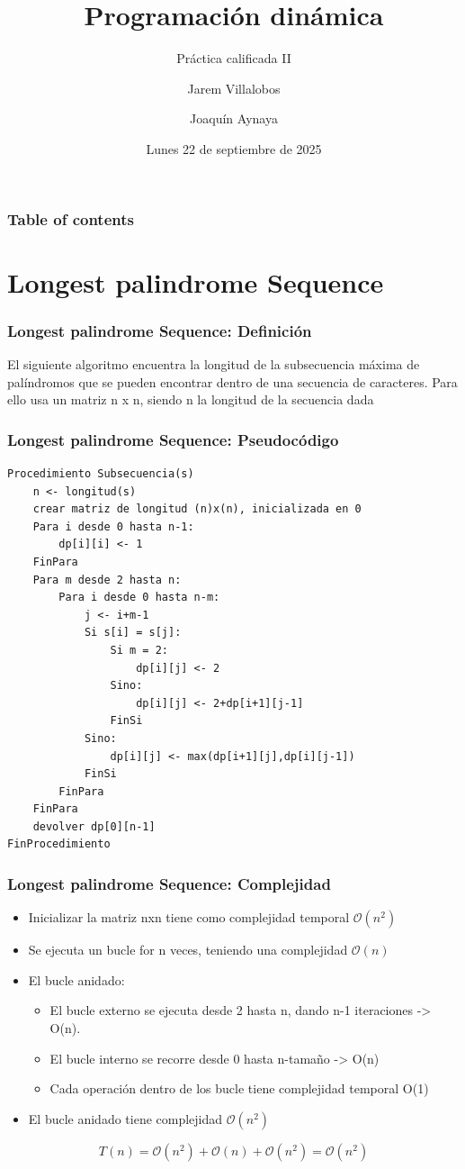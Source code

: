 \documentclass[10pt]{beamer}
\title[PC1]{Programación dinámica}
\subtitle{Práctica calificada II}
\author{Jarem Villalobos\inst{1} \and Joaquín Aynaya\inst{2}}
\date[22/09/2025]{Lunes 22 de septiembre de 2025}
\begin{document}
    \frame{\titlepage}
    \begin{frame}
        \frametitle{Table of contents}
        \tableofcontents
    \end{frame}
    \section{Longest palindrome Sequence}
    \begin{frame}
        \frametitle{Longest palindrome Sequence: Definición}
        El siguiente algoritmo encuentra la longitud de la subsecuencia máxima de palíndromos que se pueden encontrar 
        dentro de una secuencia de caracteres.
        Para ello usa un matriz n x n, siendo n la longitud de la secuencia dada
    \end{frame}
    \begin{frame}[fragile]
        \frametitle{Longest palindrome Sequence: Pseudocódigo}
        \begin{lstlisting}[basicstyle=\ttfamily\scriptsize,tabsize=4]
Procedimiento Subsecuencia(s)
	n <- longitud(s)
	crear matriz de longitud (n)x(n), inicializada en 0
	Para i desde 0 hasta n-1:
		dp[i][i] <- 1
	FinPara
	Para m desde 2 hasta n:
		Para i desde 0 hasta n-m:
			j <- i+m-1
			Si s[i] = s[j]:
				Si m = 2:
					dp[i][j] <- 2
				Sino:
					dp[i][j] <- 2+dp[i+1][j-1]
				FinSi
			Sino:
				dp[i][j] <- max(dp[i+1][j],dp[i][j-1])
			FinSi
		FinPara
	FinPara
	devolver dp[0][n-1]
FinProcedimiento
        \end{lstlisting}
    \end{frame}
    \begin{frame}
        \frametitle{Longest palindrome Sequence: Complejidad}
        \begin{itemize}
            \item Inicializar la matriz nxn tiene como complejidad temporal $\mathcal{O}(n^2)$
            \item Se ejecuta un bucle for n veces, teniendo una complejidad $\mathcal{O}(n)$ 
            \item El bucle anidado: \begin{itemize}
                \item El bucle externo se ejecuta desde 2 hasta n, dando n-1 iteraciones -> O(n).
	            \item El bucle interno se recorre desde 0 hasta n-tamaño -> O(n)
	            \item Cada operación dentro de los bucle tiene complejidad temporal O(1)
            \end{itemize}
            \item El bucle anidado tiene complejidad $\mathcal{O}(n^2)$
        \end{itemize}
        \begin{equation*}
            T(n) = \mathcal{O}(n^2) + \mathcal{O}(n) + \mathcal{O}(n^2) = \mathcal{O}(n^2)
        \end{equation*}
    \end{frame}
\end{document}

